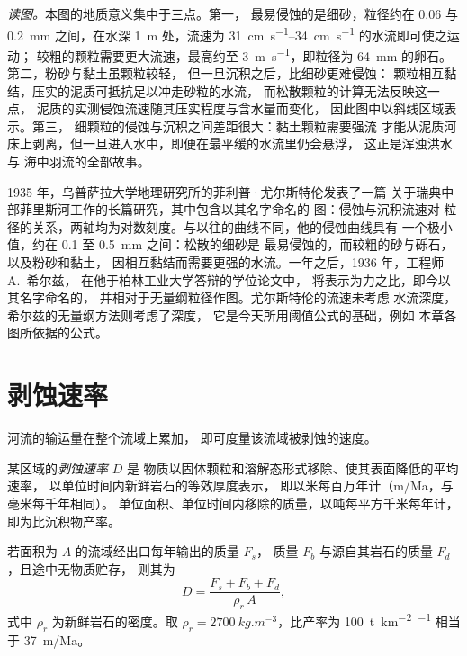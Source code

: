 \emph{读图。}本图的地质意义集中于三点。第一，
最易侵蚀的是细砂，粒径约在 \num{0.06} 与
\qty{0.2}{mm} 之间，在水深 \qty{1}{m} 处，流速为 \qtyrange{31}{34}{cm.s^{-1}} 的水流即可使之运动；
较粗的颗粒需要更大流速，最高约至
\qty{3}{m.s^{-1}}，即粒径为 \qty{64}{mm} 的卵石。第二，粉砂与黏土虽颗粒较轻，
但一旦沉积之后，比细砂更难侵蚀：
颗粒相互黏结，压实的泥质可抵抗足以冲走砂粒的水流，
而松散颗粒的计算无法反映这一点，
泥质的实测侵蚀流速随其压实程度与含水量而变化，
因此图中以斜线区域表示。第三，
细颗粒的侵蚀与沉积之间差距很大：黏土颗粒需要强流
才能从泥质河床上剥离，但一旦进入水中，即便在最平缓的水流里仍会悬浮，
这正是浑浊洪水与
海中羽流的全部故事。

\begin{history}[20 世纪 30 年代的两项研究]
1935 年，乌普萨拉大学地理研究所的菲利普·尤尔斯特伦发表了一篇
关于瑞典中部菲里斯河工作的长篇研究，其中包含以其名字命名的
图：侵蚀与沉积流速对
粒径的关系，两轴均为对数刻度。与以往的曲线不同，他的侵蚀曲线具有
一个极小值，约在 \num{0.1} 至 \qty{0.5}{mm} 之间：松散的细砂是
最易侵蚀的，而较粗的砂与砾石，以及粉砂和黏土，
因相互黏结而需要更强的水流。一年之后，1936 年，工程师 A.~希尔兹，
在他于柏林工业大学答辩的学位论文中，
将表示为力之比，即今以其名字命名的，
并相对于无量纲粒径作图。尤尔斯特伦的流速未考虑
水流深度，希尔兹的无量纲方法则考虑了深度，
它是今天所用阈值公式的基础，例如
本章各图所依据的公式。
\end{history}

\section{剥蚀速率}\label{sec:b1:erosion-transport:denudation}

河流的输运量在整个流域上累加，
即可度量该流域被剥蚀的速度。

\begin{definition}[剥蚀速率]\label{def:b1:erosion-transport:denudation}
某区域的\emph{剥蚀速率} $D$ 是
物质以固体颗粒和溶解态形式移除、使其表面降低的平均速率，
以单位时间内新鲜岩石的等效厚度表示，
即以米每百万年计（\unit{m/Ma}，与毫米每千年相同）。
单位面积、单位时间内移除的质量，以吨每平方千米每年计，
即为比沉积物产率。
\end{definition}

\begin{proposition}[由河流输运量求剥蚀速率]\label{prop:b1:erosion-transport:denudation}
若面积为 $A$ 的流域经出口每年输出的质量 $F_s$，
质量 $F_b$ 与源自其岩石的质量 $F_d$，且途中无物质贮存，
则其为
\[
  D = \frac{F_s + F_b + F_d}{\rho_r\,A},
\]
式中 $\rho_r$ 为新鲜岩石的密度。取 $\rho_r =
\qty{2700}{kg.m^{-3}}$，比产率为 \qty{100}{t.km^{-2}.^{-1}}
相当于 \qty{37}{m/Ma}。
\end{proposition}

